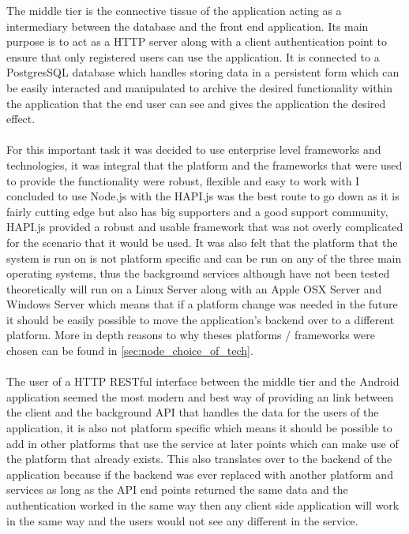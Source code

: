 The middle tier is the connective tissue of the application acting as a intermediary between the database and the front end application. Its main purpose is to act as a HTTP server along with a client authentication point to ensure that only registered users can use the application. It is connected to a PostgresSQL database which handles storing data in a persistent form which can be easily interacted and manipulated to archive the desired functionality within the application that the end user can see and gives the application the desired effect.\\
\\
For this important task it was decided to use enterprise level frameworks and technologies, it was integral that the platform and the frameworks that were used to provide the functionality were robust, flexible and easy to work with I concluded to use Node.js \cite{nodeteam:node:2015:online} with the HAPI.js \cite{hapiteam:hapti:2015:online} was the best route to go down as it is fairly cutting edge but also has big supporters and a good support community, HAPI.js provided a robust and usable framework that was not overly complicated for the scenario that it would be used. It was also felt that the platform that the system is run on is not platform specific and can be run on any of the three main operating systems, thus the background services although have not been tested theoretically will run on a Linux Server along with an Apple OSX Server and Windows Server which means that if a platform change was needed in the future it should be easily possible to move the application's backend over to a different platform. More in depth reasons to why theses platforms / frameworks were chosen can be found in \ref{sec:node_choice_of_tech}.\\
\\
The user of a HTTP RESTful interface between the middle tier and the Android application seemed the most modern and best way of providing an link between the client and the background API that handles the data for the users of the application, it is also not platform specific which means it should be possible to add in other platforms that use the service at later points which can make use of the platform that already exists. This also translates over to the backend of the application because if the backend was ever replaced with another platform and services as long as the API end points returned the same data and the authentication worked in the same way then any client side application will work in the same way and the users would not see any different in the service.\\
